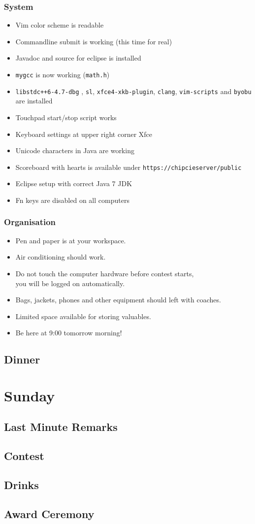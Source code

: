 \documentclass[t]{beamer}
\begin{document}
\begin{frame}[fragile]
    \frametitle{System}
    \begin{itemize}
        \item Vim color scheme is readable
        \item Commandline submit is working (this time for real)
        \item Javadoc and source for eclipse is installed
        \item \lstinline|mygcc| is now working (\lstinline|math.h|)
        \item \lstinline|libstdc++6-4.7-dbg| , \lstinline|sl|, \lstinline|xfce4-xkb-plugin|, \lstinline|clang|, \lstinline|vim-scripts| and \lstinline|byobu| are installed
        \item Touchpad start/stop script works
        \item Keyboard settings at upper right corner Xfce
        \item Unicode characters in Java are working
        \item Scoreboard with hearts is available under \lstinline|https://chipcieserver/public|
        \item Eclipse setup with correct Java 7 JDK
        \item Fn keys are disabled on all computers
     \end{itemize}
\end{frame}

\begin{frame}
    \frametitle{Organisation}
    \begin{itemize}
        \item Pen and paper is at your workspace.
        \item Air conditioning should work.
        \item Do not touch the computer hardware before contest starts,\\
        	you will be logged on automatically.
        \item Bags, jackets, phones and other equipment should left with coaches.
        \item Limited space available for storing valuables.
        \item Be here at 9:00 tomorrow morning!
     \end{itemize}
\end{frame}

\QuestionsFrame
\subsection{Dinner}
\section{Sunday}
\subsection{Last Minute Remarks}
\subsection{Contest}
\subsection{Drinks}
\subsection{Award Ceremony}
\QuestionsFrame
\end{document}
